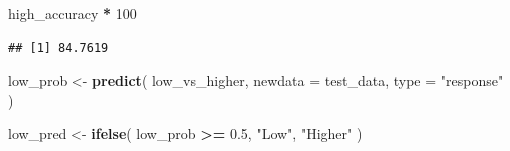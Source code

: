 \documentclass[
]{article}
\newenvironment{Shaded}{\begin{snugshade}}{\end{snugshade}}
\newcommand{\AttributeTok}[1]{\textcolor[rgb]{0.13,0.29,0.53}{#1}}
\newcommand{\DecValTok}[1]{\textcolor[rgb]{0.00,0.00,0.81}{#1}}
\newcommand{\FloatTok}[1]{\textcolor[rgb]{0.00,0.00,0.81}{#1}}
\newcommand{\FunctionTok}[1]{\textcolor[rgb]{0.13,0.29,0.53}{\textbf{#1}}}
\newcommand{\NormalTok}[1]{#1}
\newcommand{\OtherTok}[1]{\textcolor[rgb]{0.56,0.35,0.01}{#1}}
\newcommand{\SpecialCharTok}[1]{\textcolor[rgb]{0.81,0.36,0.00}{\textbf{#1}}}
\newcommand{\StringTok}[1]{\textcolor[rgb]{0.31,0.60,0.02}{#1}}
\begin{document}
\begin{Shaded}
\begin{Highlighting}[]
\NormalTok{high\_accuracy }\SpecialCharTok{*} \DecValTok{100}
\end{Highlighting}
\end{Shaded}

\begin{verbatim}
## [1] 84.7619
\end{verbatim}

\begin{Shaded}
\begin{Highlighting}[]
\NormalTok{low\_prob }\OtherTok{\textless{}{-}} \FunctionTok{predict}\NormalTok{(}
\NormalTok{  low\_vs\_higher,}
  \AttributeTok{newdata =}\NormalTok{ test\_data,}
  \AttributeTok{type =} \StringTok{"response"}
\NormalTok{)}
\end{Highlighting}
\end{Shaded}

\begin{Shaded}
\begin{Highlighting}[]
\NormalTok{low\_pred }\OtherTok{\textless{}{-}} \FunctionTok{ifelse}\NormalTok{(}
\NormalTok{  low\_prob }\SpecialCharTok{\textgreater{}=} \FloatTok{0.5}\NormalTok{,}
  \StringTok{"Low"}\NormalTok{,}
  \StringTok{"Higher"}
\NormalTok{)}
\end{Highlighting}
\end{Shaded}

\begin{Shaded}
\end{Shaded}

\begin{Shaded}
\end{Shaded}
\end{document}
